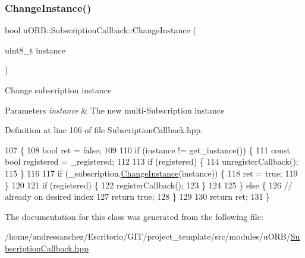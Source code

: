 \subsubsection{\texorpdfstring{Change\+Instance()}{ChangeInstance()}}
{\footnotesize\ttfamily bool u\+O\+R\+B\+::\+Subscription\+Callback\+::\+Change\+Instance (\begin{DoxyParamCaption}\item[{uint8\+\_\+t}]{instance }\end{DoxyParamCaption})\hspace{0.3cm}{\ttfamily [inline]}}

Change subscription instance 
\begin{DoxyParams}{Parameters}
{\em instance} & The new multi-\/\+Subscription instance \\
\hline
\end{DoxyParams}


Definition at line 106 of file Subscription\+Callback.\+hpp.


\begin{DoxyCode}
107     \{
108         \textcolor{keywordtype}{bool} ret = \textcolor{keyword}{false};
109 
110         \textcolor{keywordflow}{if} (instance != get\_instance()) \{
111             \textcolor{keyword}{const} \textcolor{keywordtype}{bool} registered = \_registered;
112 
113             \textcolor{keywordflow}{if} (registered) \{
114                 unregisterCallback();
115             \}
116 
117             \textcolor{keywordflow}{if} (\_subscription.\hyperlink{classuORB_1_1Subscription_a47a32a02ea909df267542d4b4ef99115}{ChangeInstance}(instance)) \{
118                 ret = \textcolor{keyword}{true};
119             \}
120 
121             \textcolor{keywordflow}{if} (registered) \{
122                 registerCallback();
123             \}
124 
125         \} \textcolor{keywordflow}{else} \{
126             \textcolor{comment}{// already on desired index}
127             \textcolor{keywordflow}{return} \textcolor{keyword}{true};
128         \}
129 
130         \textcolor{keywordflow}{return} ret;
131     \}
\end{DoxyCode}


The documentation for this class was generated from the following file\+:\begin{DoxyCompactItemize}
\item 
/home/andressanchez/\+Escritorio/\+G\+I\+T/project\+\_\+template/src/modules/u\+O\+R\+B/\hyperlink{SubscriptionCallback_8hpp}{Subscription\+Callback.\+hpp}\end{DoxyCompactItemize}
